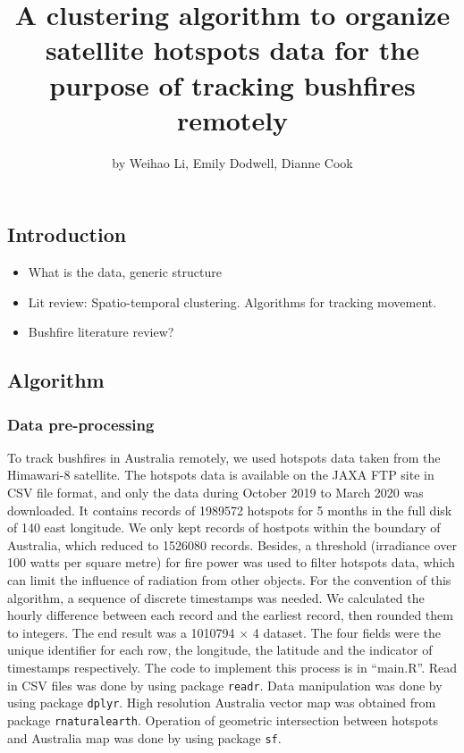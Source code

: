 \title{A clustering algorithm to organize satellite hotspots data for the
purpose of tracking bushfires remotely}
\author{by Weihao Li, Emily Dodwell, Dianne Cook}

\maketitle


\hypertarget{introduction}{%
\subsection{Introduction}\label{introduction}}

\begin{itemize}
\tightlist
\item
  What is the data, generic structure
\item
  Lit review: Spatio-temporal clustering. Algorithms for tracking
  movement.
\item
  Bushfire literature review?
\end{itemize}

\hypertarget{algorithm}{%
\subsection{Algorithm}\label{algorithm}}

\hypertarget{data-pre-processing}{%
\subsubsection{Data pre-processing}\label{data-pre-processing}}

To track bushfires in Australia remotely, we used hotspots data taken
from the Himawari-8 satellite. The hotspots data is available on the
JAXA FTP site in CSV file format, and only the data during October 2019
to March 2020 was downloaded. It contains records of 1989572 hotspots
for 5 months in the full disk of 140 \textdegree east longitude. We only
kept records of hostpots within the boundary of Australia, which reduced
to 1526080 records. Besides, a threshold (irradiance over 100 watts per
square metre) for fire power was used to filter hotspots data, which can
limit the influence of radiation from other objects. For the convention
of this algorithm, a sequence of discrete timestamps was needed. We
calculated the hourly difference between each record and the earliest
record, then rounded them to integers. The end result was a 1010794
\(\times\) 4 dataset. The four fields were the unique identifier for
each row, the longitude, the latitude and the indicator of timestamps
respectively. The code to implement this process is in ``main.R''. Read
in CSV files was done by using package \texttt{readr}. Data manipulation
was done by using package \texttt{dplyr}. High resolution Australia
vector map was obtained from package \texttt{rnaturalearth}. Operation
of geometric intersection between hotspots and Australia map was done by
using package \texttt{sf}.

